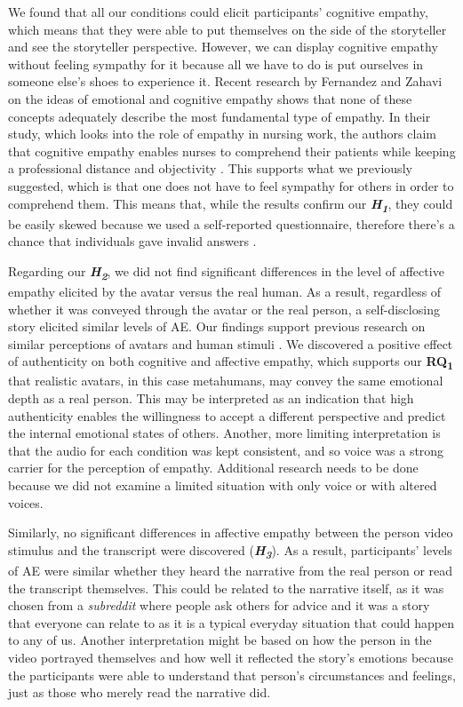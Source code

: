 We found that all our conditions could elicit participants' cognitive empathy, which means that they were able to put themselves on the side of the storyteller and see the storyteller perspective. However, we can display cognitive empathy without feeling sympathy for it because all we have to do is put ourselves in someone else's shoes to experience it. Recent research by Fernandez and Zahavi on the ideas of emotional and cognitive empathy shows that none of these concepts adequately describe the most fundamental type of empathy. In their study, which looks into the role of empathy in nursing work, the authors claim that cognitive empathy enables nurses to comprehend their patients while keeping a professional distance and objectivity \cite{FER20}. This supports what we previously suggested, which is that one does not have to feel sympathy for others in order to comprehend them. 
This means that, while the results confirm our \textbf{\textit{H\textsubscript{1}}}, they could be easily skewed because we used a self-reported questionnaire, therefore there's a chance that individuals gave invalid answers \cite{DEM15}.

Regarding our \textbf{\textit{H\textsubscript{2}}}, we did not find significant differences in the level of affective empathy elicited by the avatar versus the real human. As a result, regardless of whether it was conveyed through the avatar or the real person, a self-disclosing story elicited similar levels of AE. Our findings support previous research on similar perceptions of avatars and human stimuli \cite{ALI15, ROT19}. We discovered a positive effect of authenticity on both cognitive and affective empathy, which supports our \textbf{RQ\textsubscript{1}} that realistic avatars, in this case metahumans, may convey the same emotional depth as a real person. This may be interpreted as an indication that high authenticity enables the willingness to accept a different perspective and predict the internal emotional states of others. Another, more limiting interpretation is that the audio for each condition was kept consistent, and so voice was a strong carrier for the perception of empathy. Additional research needs to be done because we did not examine a limited situation with only voice or with altered voices.

Similarly, no significant differences in affective empathy between the person video stimulus and the transcript were discovered (\textbf{\textit{H\textsubscript{3}}}). As a result, participants' levels of AE were similar whether they heard the narrative from the real person or read the transcript themselves. This could be related to the narrative itself, as it was chosen from a \textit{subreddit} where people ask others for advice and it was a story that everyone can relate to as it is a typical everyday situation that could happen to any of us. Another interpretation might be based on how the person in the video portrayed themselves and how well it reflected the story's emotions because the participants were able to understand that person's circumstances and feelings, just as those who merely read the narrative did.

